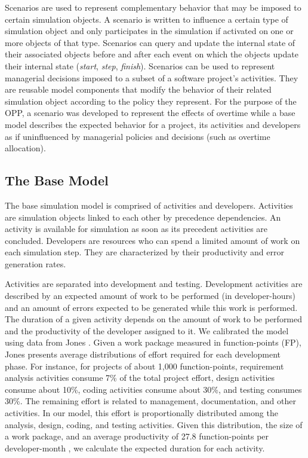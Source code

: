 \documentclass[conference]{IEEEtran}
\begin{document}
Scenarios are used to represent complementary behavior that may be imposed to certain simulation objects. A scenario is written to influence a certain type of simulation object and only participates in the simulation if activated on one or more objects of that type. Scenarios can query and update the internal state of their associated objects before and after each event on which the objects update their internal state ({\it start}, {\it step}, {\it finish}). Scenarios can be used to represent managerial decisions imposed to a subset of a software project's activities. They are reusable model components that modify the behavior of their related simulation object according to the policy they represent. For the purpose of the OPP, a scenario was developed to represent the effects of overtime while a base model describes the expected behavior for a project, its activities and developers as if uninfluenced by managerial policies and decisions (such as overtime allocation).

\subsection{The Base Model}
The base simulation model is comprised of activities and developers. Activities are simulation objects linked to each other by precedence dependencies. An activity is available for simulation as soon as its precedent activities are concluded. Developers are resources who can spend a limited amount of work on each simulation step. They are characterized by their productivity and error generation rates.

Activities are separated into development and testing. Development activities are described by an expected amount of work to be performed (in developer-hours) and an amount of errors expected to be generated while this work is performed. The duration of a given activity depends on the amount of work to be performed and the productivity of the developer assigned to it. We calibrated the model using data from Jones \cite{Jones:2000}. Given a work package measured in function-points (FP), Jones \cite{Jones:2000} presents average distributions of effort required for each development phase. For instance, for projects of about 1,000 function-points, requirement analysis activities consume 7\% of the total project effort, design activities consume about 10\%, coding activities consume about 30\%, and testing consumes 30\%. The remaining effort is related to management, documentation, and other activities. In our model, this effort is proportionally distributed among the analysis, design, coding, and testing activities. Given this distribution, the size of a work package, and an average productivity of 27.8 function-points per developer-month \cite{Jones:2000}, we calculate the expected duration for each activity.
\end{document}
